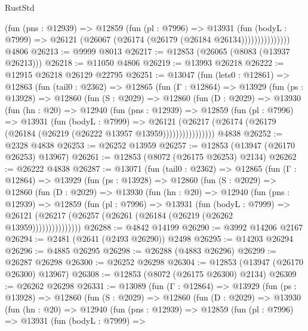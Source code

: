 \begin{lexlean}{RustStd}
\begin{coremodule}
                    (fun (pns : @12939) =>
                    @12859
                      (fun (pl : @7996) =>
                      @13931
                        (fun (bodyL : @7999) =>
                        @26121 (@26067 (@26174 (@26179 (@26184 @26134)))))))))))))))
    @4806
@26213 := @9999 @8013
@26217 := @12853 (@26065 (@8083 (@13937 @26213)))
@26218 := @11050 @4806
@26219 := @13993 @26218
@26222 := @12915 @26218 @26129 @22795
@26251 := @13047
    (fun (lets0 : @12861) =>
    @12863
      (fun (tail0 : @2362) =>
      @12865
        (fun (Γ : @12864) =>
        @13929
          (fun (ps : @13928) =>
          @12860
            (fun (S : @2029) =>
            @12860
              (fun (D : @2029) =>
              @13930
                (fun (hn : @20) =>
                @12940
                  (fun (pns : @12939) =>
                  @12859
                    (fun (pl : @7996) =>
                    @13931
                      (fun (bodyL : @7999) =>
                      @26121
                        (@26217
                          (@26174 (@26179 (@26184 (@26219 (@26222 @13957 @13959))))))))))))))))
    @4838
@26252 := @2328 @4838
@26253 := @26252 @13959
@26257 := @12853 (@13947 (@26170 @26253) @13967)
@26261 := @12853 (@8072 (@26175 @26253) @2134)
@26262 := @26222 @4838
@26287 := @13071
    (fun (tail0 : @2362) =>
    @12865
      (fun (Γ : @12864) =>
      @13929
        (fun (ps : @13928) =>
        @12860
          (fun (S : @2029) =>
          @12860
            (fun (D : @2029) =>
            @13930
              (fun (hn : @20) =>
              @12940
                (fun (pns : @12939) =>
                @12859
                  (fun (pl : @7996) =>
                  @13931
                    (fun (bodyL : @7999) =>
                    @26121 (@26217 (@26257 (@26261 (@26184 (@26219 (@26262 @13959)))))))))))))))
@26288 := @4842 @14199
@26290 := @3992 @14206 @2167
@26294 := @2481 (@2641 (@2493 @26290)) @2498
@26295 := @14203 @26294
@26296 := @4885 @26295
@26298 := @26288 (@4883 @26296)
@26299 := @26287 @26298
@26300 := @26252 @26298
@26304 := @12853 (@13947 (@26170 @26300) @13967)
@26308 := @12853 (@8072 (@26175 @26300) @2134)
@26309 := @26262 @26298
@26331 := @13089
    (fun (Γ : @12864) =>
    @13929
      (fun (ps : @13928) =>
      @12860
        (fun (S : @2029) =>
        @12860
          (fun (D : @2029) =>
          @13930
            (fun (hn : @20) =>
            @12940
              (fun (pns : @12939) =>
              @12859
                (fun (pl : @7996) =>
                @13931
                  (fun (bodyL : @7999) =>

\end{coremodule}
\end{lexlean}
